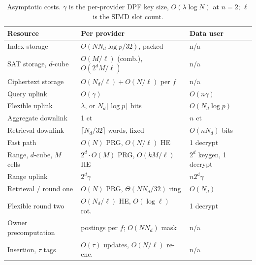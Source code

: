 \documentclass[a4paper,fleqn]{cas-sc}
\begin{document}
\begin{table}[pos=htbp]
\caption{Asymptotic costs. $\gamma$ is the per-provider DPF key size,
$O(\lambda\log N)$ at $n=2$; $\ell$ is the SIMD slot count.}
\label{tab:complexity}
\centering
\scriptsize
\setlength{\tabcolsep}{2pt}
\renewcommand{\arraystretch}{1.2}
\begin{tabular*}{\tblwidth}{@{\extracolsep{\fill}}lll@{}}
\toprule
Resource & Per provider & Data user \\
\midrule
Index storage           & $O(N N_d\log p/32)$, packed       & n/a \\
SAT storage, $d$-cube   & $O(M/\ell)$ (comb.), $O(2^dM/\ell)$ & n/a \\
Ciphertext storage      & $O(N_d/\ell)+O(N/\ell)$ per $f$   & n/a \\
Query uplink            & $O(\gamma)$                       & $O(n\gamma)$ \\
Flexible uplink         & $\lambda$, or $N_d\lceil\log p\rceil$ bits & $O(N_d\log p)$ \\
Aggregate downlink      & 1 ct                              & $n$ ct \\
Retrieval downlink      & $\lceil N_d/32\rceil$ words, fixed & $O(nN_d)$ bits \\
Fast path               & $O(N)$ PRG, $O(N/\ell)$ HE        & 1 decrypt \\
Range, $d$-cube, $M$ cells & $2^d\cdot O(M)$ PRG, $O(kM/\ell)$ HE & $2^d$ keygen, 1 decrypt \\
Range uplink            & $2^d\gamma$                       & $n2^d\gamma$ \\
Retrieval / round one   & $O(N)$ PRG, $\Theta(NN_d/32)$ ring & $O(N_d)$ \\
Flexible round two      & $O(N_d/\ell)$ HE, $O(\log\ell)$ rot.& 1 decrypt \\
Owner precomputation    & postings per $f$; $O(NN_d)$ mask  & n/a \\
Insertion, $\tau$ tags  & $O(\tau)$ updates, $O(N/\ell)$ re-enc. & n/a \\
\bottomrule
\end{tabular*}
\end{table}

\end{document}
